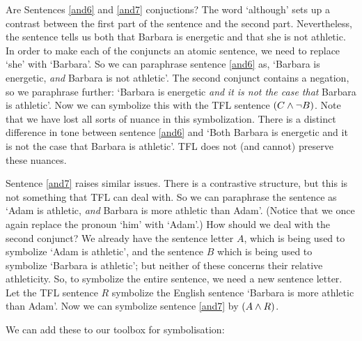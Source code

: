 Are Sentences \ref{and6} and \ref{and7} conjuctions? The word `although' sets up a contrast between the first part of the sentence and the second part. Nevertheless, the sentence tells us both that Barbara is energetic and that she is not athletic. In order to make each of the conjuncts an atomic sentence, we need to replace `she' with `Barbara'. So we can paraphrase sentence \ref{and6} as, `Barbara is energetic, \emph{and} Barbara is not athletic'. The second conjunct contains a negation, so we paraphrase further: `Barbara is energetic \emph{and} \emph{it is not the case that} Barbara is athletic'. Now we can symbolize this with the TFL sentence $(C\mathbin{\wedge}\neg B)$. Note that we have lost all sorts of nuance in this symbolization. There is a distinct difference in tone between sentence \ref{and6} and `Both Barbara is energetic and it is not the case that Barbara is athletic'. TFL does not (and cannot) preserve these nuances.

Sentence \ref{and7} raises similar issues. There is a contrastive structure, but this is not something that TFL can deal with. So we can paraphrase the sentence as `Adam is athletic, \emph{and} Barbara is more athletic than Adam'. (Notice that we once again replace the pronoun `him' with `Adam'.) How should we deal with the second conjunct? We already have the sentence letter $A$, which is being used to symbolize `Adam is athletic', and the sentence $B$ which is being used to symbolize `Barbara is athletic'; but neither of these concerns their relative athleticity. So, to symbolize the entire sentence, we need a new sentence letter. Let the TFL sentence $R$ symbolize the English sentence `Barbara is more athletic than Adam'. Now we can symbolize sentence \ref{and7} by $(A \mathbin{\wedge} R)$.

We can add these to our toolbox for symbolisation:

